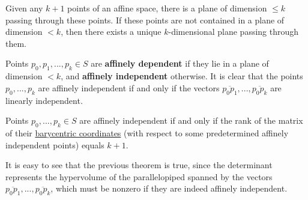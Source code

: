   \begin{theorem}
    \label{thm:plane-through-k1-points}
    Given any $k+1$ points of an affine space, there is a plane of dimension $\leq k$ passing through these points. If these points are not contained in a plane of dimension $< k$, then there exists a unique $k$-dimensional plane passing through them. 
  \end{theorem}

  \begin{definition}
    \label{def:affine-dependence-and-independence}
    Points $p_0, p_1, ..., p_k \in S$ are \textbf{affinely dependent} if they lie in a plane of dimension $<k$, and \textbf{affinely independent} otherwise. It is clear that the points $p_0,..., p_k$ are affinely independent if and only if the vectors $\overline{p_0p_1}, ..., \overline{p_0 p_k}$ are linearly independent. 
  \end{definition}

  \begin{theorem}
    \label{thm:rank-criterion-for-affine-independence}
    Points $p_0, ..., p_k \in S$ are affinely independent if and only if the rank of the matrix of their \hyperref[def:barycentric-coordinates]{barycentric coordinates} (with respect to some predetermined affinely independent points) equals $k+1$. 
  \end{theorem}

  It is easy to see that the previous theorem is true, since the determinant represents the hypervolume of the parallelopiped spanned by the vectors $\overline{p_0p_1}, ..., \overline{p_0 p_k}$, which must be nonzero if they are indeed affinely independent. 

